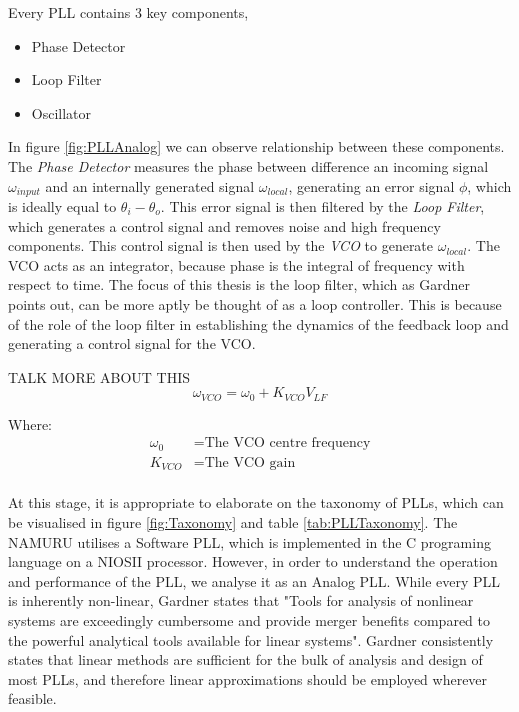 

Every PLL contains 3 key components,

\begin{itemize}
\item{Phase Detector}
\item{Loop Filter}
\item{Oscillator}
\end{itemize}

In figure \ref{fig:PLLAnalog} we can observe relationship between these components. The \emph{Phase Detector} measures the phase between difference an incoming signal $\omega_{input}$ and an internally generated signal $\omega_{local}$, generating an error signal $\phi$, which is ideally equal to $\theta_i -\theta_o$. This error signal is then filtered by the \emph{Loop Filter}, which generates a control signal and  removes noise and high frequency components. This control signal is then used by the \emph{\ac{VCO}} to generate $\omega_{local}$. The \ac{VCO} acts as an integrator, because phase is the integral of frequency with respect to time. The focus of this thesis is the loop filter, which as Gardner points out, can be more aptly be thought of as a loop controller\cite{Gardner}. This is because of the role of the loop filter in establishing the dynamics of the feedback loop and generating a control signal for the VCO\cite{Kaplan}.

TALK MORE ABOUT THIS
\begin{equation}
	\omega_{VCO} = \omega_0 + K_{VCO}V_{LF}
\end{equation}

Where:
\begin{align*}
	\omega_0 &= \text{The VCO centre frequency}\\
	K_{VCO} &= \text{The VCO gain}\\
\end{align*}




At this stage, it is appropriate to elaborate on the taxonomy of PLLs, which can be visualised in figure \ref{fig:Taxonomy} and table \ref{tab:PLLTaxonomy}. The \ac{NAMURU} utilises a Software PLL, which is implemented in the C programing language on a NIOSII processor. However, in order to understand the operation and performance of the PLL, we analyse it as an Analog PLL. While every PLL is inherently non-linear, Gardner states that "Tools for analysis of nonlinear systems are exceedingly cumbersome and provide merger benefits compared to the powerful analytical tools available for linear systems". Gardner consistently states that linear methods are sufficient for the bulk of analysis and design of most PLLs, and therefore linear approximations should be employed wherever feasible\cite{Gardner}. 

